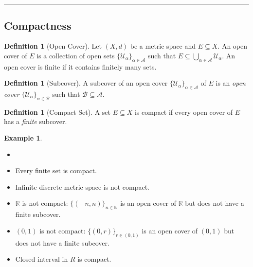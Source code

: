 \documentclass[12pt, lettersize]{book}
\theoremstyle{plain}
\theoremstyle{definition}
\newtheorem{dfn}[thm]{Definition}
\newtheorem*{eg}{Example}
\theoremstyle{remark}
\newcommand{\R}{\mathbb{R}}
\newcommand{\N}{\mathbb{N}}
\begin{document}
	\noindent\rule{\textwidth}{1pt}
	\subsection*{Compactness}
	
	\begin{dfn}[Open Cover]
		Let $(X,d)$ be a metric space and $E\subseteq X$. An open cover of $E$ is a collection of open sets $\{\mathcal{U}_\alpha\}_{\alpha\in\mathcal{A}}$ such that $E\subseteq\bigcup_{\alpha\in\mathcal{A}}\mathcal{U}_\alpha$. An open cover is finite if it contains finitely many sets.
	\end{dfn}
	
	\begin{dfn}[Subcover]
		A subcover of an open cover $\{\mathcal{U}_\alpha\}_{\alpha\in\mathcal{A}}$ of $E$ is an \emph{open cover} $\{\mathcal{U}_\alpha\}_{\alpha\in\mathcal{B}}$ such that $\mathcal{B}\subseteq\mathcal{A}$.
	\end{dfn}
	
	\begin{dfn}[Compact Set]
		A set $E\subseteq X$ is compact if every open cover of $E$ has a \emph{finite} subcover.
	\end{dfn}
	\begin{eg}
		\begin{itemize}
			\item[]
			\item Every finite set is compact.
			\item Infinite discrete metric space is not compact.
			\item $\R$ is not compact: $\{(-n,n)\}_{n\in\N}$ is an open cover of $\R$ but does not have a finite subcover.
			\item $(0,1)$ is not compact: $\{(0,r)\}_{r\in(0,1)} $ is an open cover of $(0,1)$ but does not have a finite subcover.
			\item Closed interval in $R$ is compact.
		\end{itemize}
	\end{eg}
	
\end{document}
